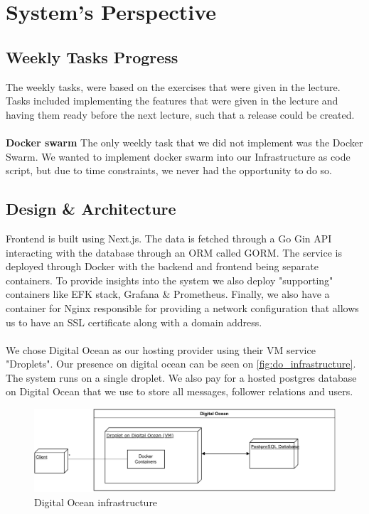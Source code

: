 \section{System's Perspective}


\subsection{Weekly Tasks Progress}
The weekly tasks, were based on the exercises that were given in the lecture. Tasks included implementing the features that were given in the lecture and having them ready before the next lecture, such that a release could be created.
\\\\
\textbf{Docker swarm}
The only weekly task that we did not implement was the Docker Swarm. We wanted to implement docker swarm into our Infrastructure as code script, but due to time constraints, we never had the opportunity to do so. 

\subsection{Design \& Architecture}
Frontend is built using Next.js\cite{nextjs}. The data is fetched through a Go Gin\cite{gin-gonic} API interacting with the database through an ORM called GORM\cite{gorm}. The service is deployed through Docker with the backend and frontend being separate containers. To provide insights into the system we also deploy "supporting" containers like EFK stack, Grafana \& Prometheus. Finally, we also have a container for Nginx responsible for providing a network configuration that allows us to have an SSL certificate along with a domain address.
\\\\
We chose Digital Ocean as our hosting provider using their VM service "Droplets". Our presence on digital ocean can be seen on \autoref{fig:do_infrastructure}. The system runs on a single droplet. We also pay for a hosted postgres database on Digital Ocean that we use to store all messages, follower relations and users. 

\begin{figure}[h!]
    \centering
    \includegraphics[scale=0.65]{diagrams/infrastructure.pdf}
    \caption{Digital Ocean infrastructure}
    \label{fig:do_infrastructure}
\end{figure}

